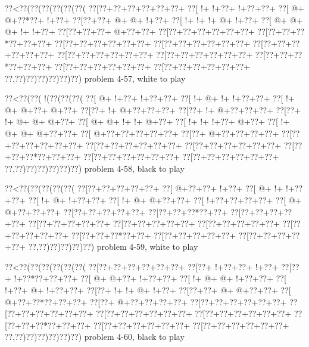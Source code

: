 \vbox{\vbox{\goo
\0??<\0??(\0??(\0??(\0??(\0??(\0??(
\0??[\0??+\0??+\0??+\0??+\0??+\0??+
\0??[\- !+\- !+\0??+\- !+\0??+\0??+
\0??[\- @+\- @+\0??*\0??+\- !+\0??+
\0??[\0??+\0??+\- @+\- @+\- !+\0??+
\0??[\- !+\- !+\- !+\- @+\- !+\0??+
\0??[\- @+\- @+\- @+\- !+\- !+\0??+
\0??[\0??+\0??+\0??+\- @+\0??+\0??+
\0??[\0??+\0??+\0??+\0??+\0??+\0??+
\0??[\0??+\0??+\0??*\0??+\0??+\0??+
\0??[\0??+\0??+\0??+\0??+\0??+\0??+
\0??[\0??+\0??+\0??+\0??+\0??+\0??+
\0??[\0??+\0??+\0??+\0??+\0??+\0??+
\0??[\0??+\0??+\0??+\0??+\0??+\0??+
\0??[\0??+\0??+\0??+\0??+\0??+\0??+
\0??[\0??+\0??+\0??*\0??+\0??+\0??+
\0??[\0??+\0??+\0??+\0??+\0??+\0??+
\0??[\0??+\0??+\0??+\0??+\0??+\0??+
\0??,\0??)\0??)\0??)\0??)\0??)\0??)
}
\hfil problem 4-57, white to play\hfil\break
}

\vbox{\vbox{\goo
\0??<\0??(\0??(\- !(\0??(\0??(\0??(
\0??[\- @+\- !+\0??+\- !+\0??+\0??+
\0??[\- !+\- @+\- !+\- !+\0??+\0??+
\0??[\- !+\- @+\- @+\0??+\- @+\0??+
\0??[\0??+\- !+\- @+\0??+\0??+\0??+
\0??[\0??+\- !+\- @+\0??+\0??+\0??+
\0??[\0??+\- !+\- @+\- @+\- @+\0??+
\0??[\- @+\- @+\- !+\- !+\- @+\0??+
\0??[\- !+\- !+\- !+\0??+\- @+\0??+
\0??[\- !+\- @+\- @+\- @+\0??+\0??+
\0??[\- @+\0??+\0??+\0??+\0??+\0??+
\0??[\0??+\- @+\0??+\0??+\0??+\0??+
\0??[\0??+\0??+\0??+\0??+\0??+\0??+
\0??[\0??+\0??+\0??+\0??+\0??+\0??+
\0??[\0??+\0??+\0??+\0??+\0??+\0??+
\0??[\0??+\0??+\0??*\0??+\0??+\0??+
\0??[\0??+\0??+\0??+\0??+\0??+\0??+
\0??[\0??+\0??+\0??+\0??+\0??+\0??+
\0??,\0??)\0??)\0??)\0??)\0??)\0??)
}
\hfil problem 4-58, black to play\hfil\break
}

\vbox{\vbox{\goo
\0??<\0??(\0??(\0??(\0??(\0??(
\0??[\0??+\0??+\0??+\0??+\0??+
\0??[\- @+\0??+\0??+\- !+\0??+
\0??[\- @+\- !+\- !+\0??+\0??+
\0??[\- !+\- @+\- !+\0??+\0??+
\0??[\- !+\- @+\- @+\0??+\0??+
\0??[\- !+\0??+\0??+\0??+\0??+
\0??[\- @+\- @+\0??+\0??+\0??+
\0??[\0??+\0??+\0??+\0??+\0??+
\0??[\0??+\0??+\0??*\0??+\0??+
\0??[\0??+\0??+\0??+\0??+\0??+
\0??[\0??+\0??+\0??+\0??+\0??+
\0??[\0??+\0??+\0??+\0??+\0??+
\0??[\0??+\0??+\0??+\0??+\0??+
\0??[\0??+\0??+\0??+\0??+\0??+
\0??[\0??+\0??+\0??*\0??+\0??+
\0??[\0??+\0??+\0??+\0??+\0??+
\0??[\0??+\0??+\0??+\0??+\0??+
\0??,\0??)\0??)\0??)\0??)\0??)
}
\hfil problem 4-59, white to play\hfil\break
}

\vbox{\vbox{\goo
\0??<\0??(\0??(\0??(\0??(\0??(\0??(
\0??[\0??+\0??+\0??+\0??+\0??+\0??+
\0??[\0??+\- !+\0??+\0??+\- !+\0??+
\0??[\0??+\- !+\0??*\0??+\0??+\0??+
\0??[\- @+\- @+\0??+\- !+\0??+\0??+
\0??[\- !+\- @+\- @+\- !+\0??+\0??+
\0??[\- !+\0??+\- @+\- !+\0??+\0??+
\0??[\0??+\- !+\- !+\- @+\- !+\0??+
\0??[\0??+\0??+\- @+\- @+\0??+\0??+
\0??[\- @+\0??+\0??*\0??+\0??+\0??+
\0??[\0??+\- @+\0??+\0??+\0??+\0??+
\0??[\0??+\0??+\0??+\0??+\0??+\0??+
\0??[\0??+\0??+\0??+\0??+\0??+\0??+
\0??[\0??+\0??+\0??+\0??+\0??+\0??+
\0??[\0??+\0??+\0??+\0??+\0??+\0??+
\0??[\0??+\0??+\0??*\0??+\0??+\0??+
\0??[\0??+\0??+\0??+\0??+\0??+\0??+
\0??[\0??+\0??+\0??+\0??+\0??+\0??+
\0??,\0??)\0??)\0??)\0??)\0??)\0??)
}
\hfil problem 4-60, black to play\hfil\break
}

